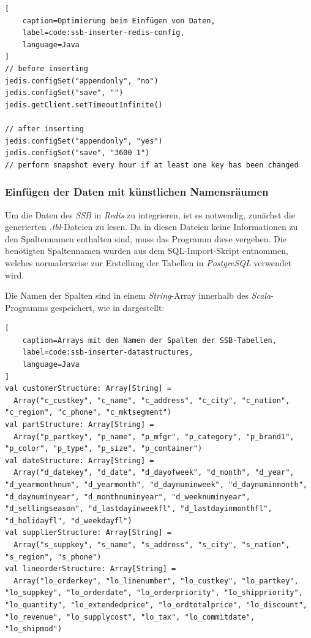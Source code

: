 \begin{lstlisting}[
    caption=Optimierung beim Einfügen von Daten,
    label=code:ssb-inserter-redis-config,
    language=Java
]
// before inserting
jedis.configSet("appendonly", "no")
jedis.configSet("save", "")
jedis.getClient.setTimeoutInfinite()

// after inserting
jedis.configSet("appendonly", "yes")
jedis.configSet("save", "3600 1")
// perform snapshot every hour if at least one key has been changed
\end{lstlisting}


\subsubsection{Einfügen der Daten mit künstlichen Namensräumen}
Um die Daten des \emph{SSB} in \emph{Redis} zu integrieren, ist es notwendig, zunächst die generierten \emph{.tbl}-Dateien zu lesen. Da in diesen Dateien keine Informationen zu den Spaltennamen enthalten sind, muss das Programm diese vergeben. Die benötigten Spaltennamen wurden aus dem SQL-Import-Skript entnommen, welches normalerweise zur Erstellung der Tabellen in \emph{PostgreSQL} verwendet wird.

Die Namen der Spalten sind in einem \emph{String}-Array innerhalb des \emph{Scala}-Programms gespeichert, wie in  dargestellt:

\begin{lstlisting}[
    caption=Arrays mit den Namen der Spalten der SSB-Tabellen,
    label=code:ssb-inserter-datastructures,
    language=Java
]
val customerStructure: Array[String] =
  Array("c_custkey", "c_name", "c_address", "c_city", "c_nation", "c_region", "c_phone", "c_mktsegment")
val partStructure: Array[String] =
  Array("p_partkey", "p_name", "p_mfgr", "p_category", "p_brand1", "p_color", "p_type", "p_size", "p_container")
val dateStructure: Array[String] =
  Array("d_datekey", "d_date", "d_dayofweek", "d_month", "d_year", "d_yearmonthnum", "d_yearmonth", "d_daynuminweek", "d_daynuminmonth", "d_daynuminyear", "d_monthnuminyear", "d_weeknuminyear", "d_sellingseason", "d_lastdayinweekfl", "d_lastdayinmonthfl", "d_holidayfl", "d_weekdayfl")
val supplierStructure: Array[String] =
  Array("s_suppkey", "s_name", "s_address", "s_city", "s_nation", "s_region", "s_phone")
val lineorderStructure: Array[String] =
  Array("lo_orderkey", "lo_linenumber", "lo_custkey", "lo_partkey", "lo_suppkey", "lo_orderdate", "lo_orderpriority", "lo_shippriority", "lo_quantity", "lo_extendedprice", "lo_ordtotalprice", "lo_discount", "lo_revenue", "lo_supplycost", "lo_tax", "lo_commitdate", "lo_shipmod")

\end{lstlisting}



